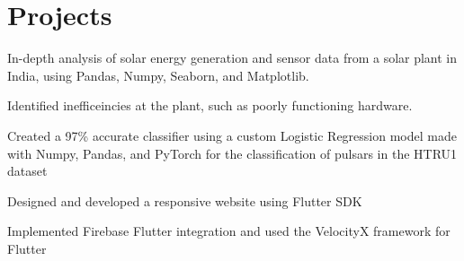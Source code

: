 \documentclass[]{resume-template}
\begin{document}
\hfill
\begin{minipage}[t]{0.66\textwidth} 


\section{Projects}\label{sec:projects}
\vspace{\topsep} %
\begin{tightemize}
\item In-depth analysis of solar energy generation and sensor data from a solar plant in India, using Pandas, Numpy, Seaborn, and Matplotlib.
\item Identified inefficeincies at the plant, such as poorly functioning hardware.  
\end{tightemize}

\vspace{\topsep} %
\begin{tightemize}
\item Created a 97\% accurate classifier using a custom Logistic Regression model made with Numpy, Pandas, and PyTorch for the classification of pulsars in the HTRU1 dataset
\end{tightemize}

\begin{tightemize}
\item Designed and developed a responsive website using Flutter SDK
\item Implemented Firebase Flutter integration and used the VelocityX framework for Flutter
\end{tightemize}


\sectionsep{}




\end{minipage}
\end{document}
